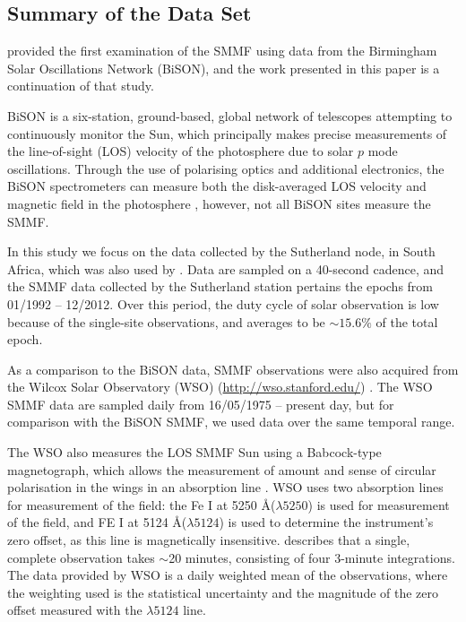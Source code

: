 \subsection{Summary of the Data Set}

\citet{chaplin_studies_2003} provided the first examination of the SMMF using data from the Birmingham Solar Oscillations Network (BiSON), and the work presented in this paper is a continuation of that study. 

BiSON is a six-station, ground-based, global network of telescopes attempting to continuously monitor the Sun, which principally makes precise measurements of the line-of-sight (LOS) velocity of the photosphere due to solar $p$ mode oscillations. Through the use of polarising optics and additional electronics, the BiSON spectrometers can measure both the disk-averaged LOS velocity and magnetic field in the photosphere \citep{chaplin_studies_2003}, however, not all BiSON sites measure the SMMF. 

In this study we focus on the data collected by the Sutherland node, in South Africa, which was also used by \cite{chaplin_studies_2003}. Data are sampled on a 40-second cadence, and the SMMF data collected by the Sutherland station pertains the epochs from 01/1992 -- 12/2012. Over this period, the duty cycle of solar observation is low because of the single-site observations, and averages to be $\sim 15.6\%$ of the total epoch.

As a comparison to the BiSON data, SMMF observations were also acquired from the Wilcox Solar Observatory (WSO) (\url{http://wso.stanford.edu/}) \citep{scherrer_mean_1977-1}. The WSO SMMF data are sampled daily from 16/05/1975 -- present day, but for comparison with the BiSON SMMF, we used data over the same temporal range.

The WSO also measures the LOS SMMF Sun using a Babcock-type magnetograph, which allows the measurement of amount and sense of circular polarisation in the wings in an absorption line \citep{scherrer_mean_1977}. WSO uses two absorption lines for measurement of the field: the Fe I at 5250 \AA ($\lambda 5250$) is used for measurement of the field, and FE I at 5124 \AA ($\lambda 5124$) is used to determine the instrument's zero offset, as this line is magnetically insensitive. \cite{scherrer_mean_1977} describes that a single, complete observation takes $\sim$20 minutes, consisting of four 3-minute integrations. The data provided by WSO is a daily weighted mean of the observations, where the weighting used is the statistical uncertainty and the magnitude of the zero offset measured with the $\lambda 5124$ line.



